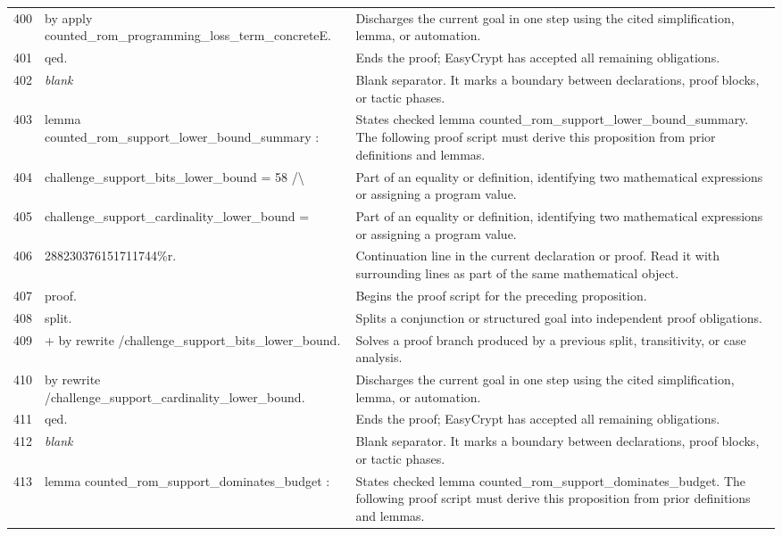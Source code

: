 \documentclass[10pt]{article}
\begin{document}
\begin{longtable}{r L{0.53\textwidth} L{0.37\textwidth}}
400 & {\ttfamily\scriptsize by apply counted\_rom\_programming\_loss\_term\_concreteE.} & Discharges the current goal in one step using the cited simplification, lemma, or automation. \\
401 & {\ttfamily\scriptsize qed.} & Ends the proof; EasyCrypt has accepted all remaining obligations. \\
402 & {\ttfamily\scriptsize \emph{blank}} & Blank separator.  It marks a boundary between declarations, proof blocks, or tactic phases. \\
403 & {\ttfamily\scriptsize lemma counted\_rom\_support\_lower\_bound\_summary :} & States checked lemma counted\_rom\_support\_lower\_bound\_summary.  The following proof script must derive this proposition from prior definitions and lemmas. \\
404 & {\ttfamily\scriptsize   challenge\_support\_bits\_lower\_bound = 58 /\textbackslash{}} & Part of an equality or definition, identifying two mathematical expressions or assigning a program value. \\
405 & {\ttfamily\scriptsize   challenge\_support\_cardinality\_lower\_bound =} & Part of an equality or definition, identifying two mathematical expressions or assigning a program value. \\
406 & {\ttfamily\scriptsize     288230376151711744\%r.} & Continuation line in the current declaration or proof.  Read it with surrounding lines as part of the same mathematical object. \\
407 & {\ttfamily\scriptsize proof.} & Begins the proof script for the preceding proposition. \\
408 & {\ttfamily\scriptsize split.} & Splits a conjunction or structured goal into independent proof obligations. \\
409 & {\ttfamily\scriptsize + by rewrite /challenge\_support\_bits\_lower\_bound.} & Solves a proof branch produced by a previous split, transitivity, or case analysis. \\
410 & {\ttfamily\scriptsize by rewrite /challenge\_support\_cardinality\_lower\_bound.} & Discharges the current goal in one step using the cited simplification, lemma, or automation. \\
411 & {\ttfamily\scriptsize qed.} & Ends the proof; EasyCrypt has accepted all remaining obligations. \\
412 & {\ttfamily\scriptsize \emph{blank}} & Blank separator.  It marks a boundary between declarations, proof blocks, or tactic phases. \\
413 & {\ttfamily\scriptsize lemma counted\_rom\_support\_dominates\_budget :} & States checked lemma counted\_rom\_support\_dominates\_budget.  The following proof script must derive this proposition from prior definitions and lemmas. \\

\end{longtable}
\end{document}

